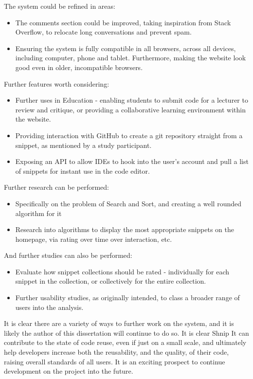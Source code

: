 The system could be refined in areas:
\begin{itemize}
\item The comments section could be improved, taking inspiration from Stack Overflow, to relocate long conversations and prevent spam.
\item Ensuring the system is fully compatible in all browsers, across all devices, including computer, phone and tablet. Furthermore, making the website look good even in older, incompatible browsers.
\end{itemize}

Further features worth considering:
\begin{itemize}
\item Further uses in Education - enabling students to submit code for a lecturer to review and critique, or providing a collaborative learning environment within the website.
\item Providing interaction with GitHub to create a git repository straight from a snippet, as mentioned by a study participant.
\item Exposing an API to allow IDEs to hook into the user's account and pull a list of snippets for instant use in the code editor.
\end{itemize}

Further research can be performed:
\begin{itemize}
\item Specifically on the problem of Search and Sort, and creating a well rounded algorithm for it
\item Research into algorithms to display the most appropriate snippets on the homepage, via rating over time over interaction, etc.
\end{itemize}

And further studies can also be performed:
\begin{itemize}
\item Evaluate how snippet collections should be rated - individually for each snippet in the collection, or collectively for the entire collection.
\item Further usability studies, as originally intended, to class a broader range of users into the analysis.
\end{itemize}


It is clear there are a variety of ways to further work on the system, and it is likely the author of this dissertation will continue to do so.
It is clear Shnip It can contribute to the state of code reuse, even if just on a small scale, and ultimately help developers increase both the reusability, and the quality, of their code, raising overall standards of all users.
It is an exciting prospect to continue development on the project into the future.



